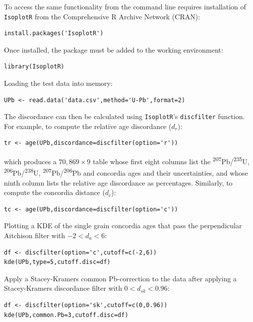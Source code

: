 \documentclass{article}
\begin{document}
To access the same functionality from the command line requires
installation of \texttt{IsoplotR} from the Comprehensive R Archive
Network (CRAN):

\begin{verbatim}
install.packages('IsoplotR')
\end{verbatim}

\noindent Once installed, the package must be added to the working
environment:

\begin{verbatim}
library(IsoplotR)
\end{verbatim}

\noindent Loading the test data into memory:

\begin{verbatim}
UPb <- read.data('data.csv',method='U-Pb',format=2)
\end{verbatim}

\noindent The discordance can then be calculated using
\texttt{IsoplotR}'s \texttt{discfilter} function. For example, to
compute the relative age discordance ($d_r$):

\begin{verbatim}
tr <- age(UPb,discordance=discfilter(option='r'))
\end{verbatim}

\noindent which produces a ${70,869}\times{9}$ table whose first eight
columns list the \textsuperscript{207}Pb/\textsuperscript{235}U,
\textsuperscript{206}Pb/\textsuperscript{238}U,
\textsuperscript{207}Pb/\textsuperscript{206}Pb and concordia ages and
their uncertainties, and whose ninth column lists the relative age
discordance as percentages. Similarly, to compute the concordia
distance ($d_c$):

\begin{verbatim}
tc <- age(UPb,discordance=discfilter(option='c'))
\end{verbatim}

\noindent Plotting a KDE of the single grain concordia ages that pass
the perpendicular Aitchison filter with ${-2}<{d_a}<{6}$:

\begin{verbatim}
df <- discfilter(option='c',cutoff=c(-2,6))
kde(UPb,type=5,cutoff.disc=df)
\end{verbatim}

\noindent Apply a Stacey-Kramers common Pb-correction to the data
after applying a Stacey-Kramers discordance filter with
${0}<{d_{sk}}<{0.96}$:

\begin{verbatim}
df <- discfilter(option='sk',cutoff=c(0,0.96))
kde(UPb,common.Pb=3,cutoff.disc=df)
\end{verbatim}
\end{document}
